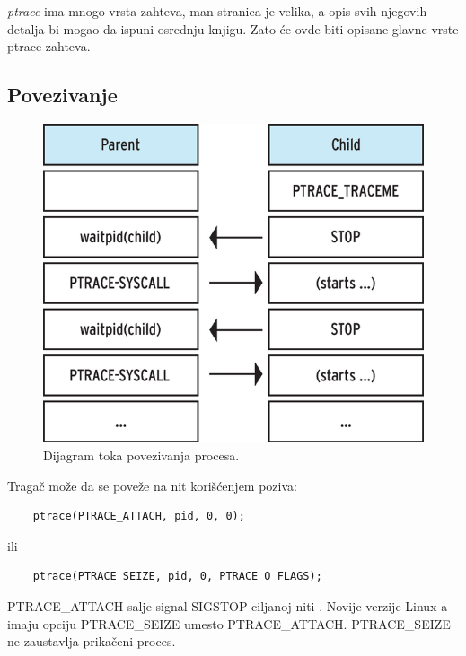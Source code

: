 \documentclass[a4paper]{article}
\begin{document}
\emph{ptrace} ima mnogo vrsta zahteva, man stranica je velika, a opis svih njegovih detalja bi mogao da ispuni osrednju knjigu.
Zato će ovde biti opisane glavne vrste ptrace zahteva. 

\subsection{Povezivanje}	

\label{sec:pov}
\begin{figure}[h!]
    \begin{center}
    \includegraphics[scale=1.1]{img/diag.png}
    \end{center}
    \caption{Dijagram toka povezivanja procesa.}
    \label{fig:diag}
\end{figure}

Tragač može da se poveže na nit korišćenjem poziva:

\begin{verbatim}
    ptrace(PTRACE_ATTACH, pid, 0, 0);
\end{verbatim}
ili
\begin{verbatim}
    ptrace(PTRACE_SEIZE, pid, 0, PTRACE_O_FLAGS);
\end{verbatim}

PTRACE\_ATTACH salje signal SIGSTOP ciljanoj niti \cite{man}. 
Novije verzije Linux-a imaju opciju PTRACE\_SEIZE umesto 
PTRACE\_ATTACH. PTRACE\_SEIZE ne zaustavlja prikačeni proces.
\end{document}
